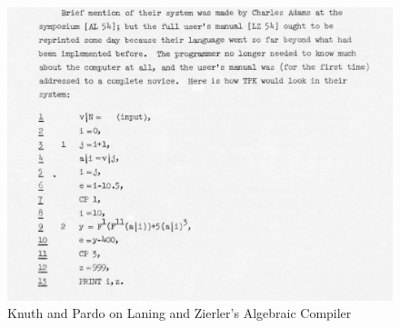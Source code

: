 \begin{figure}[h!]
	\centering
	\includegraphics[width=0.5\linewidth]{resource/knuth_pardo_on_laning_zierlers_algebraic_compiler.png}
	\caption{Knuth and Pardo on Laning and Zierler's Algebraic Compiler}
	\label{fig:knuth-pardo-on-laning-zierler}
\end{figure}
